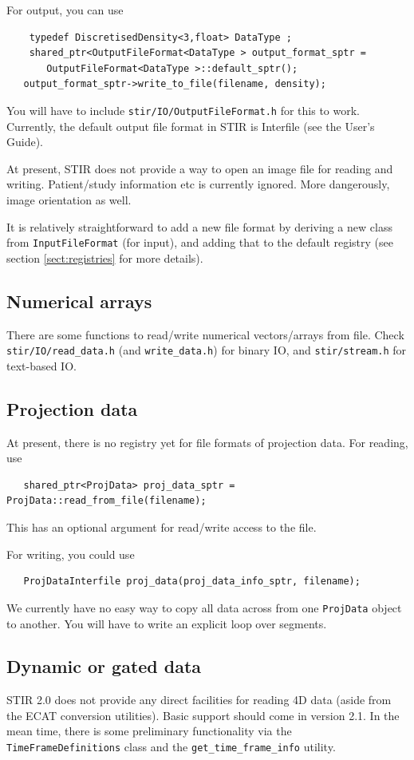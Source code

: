 \documentclass{article}
\begin{document}
For output, you can use
\begin{verbatim}
    typedef DiscretisedDensity<3,float> DataType ;
    shared_ptr<OutputFileFormat<DataType > output_format_sptr =
       OutputFileFormat<DataType >::default_sptr();
   output_format_sptr->write_to_file(filename, density);
\end{verbatim}
You will have to include \texttt{stir/IO/OutputFileFormat.h} for this to work.
Currently, the default output file format in STIR is Interfile (see the User's Guide).

At present, STIR does not provide a way to open an image file for reading and writing.
Patient/study information etc is currently ignored. More dangerously, image orientation
as well.

It is relatively straightforward to add a new file format by deriving a new class
from \texttt{InputFileFormat} (for input), and adding that to the default registry
(see section \ref{sect:registries} for more details).

\subsection{Numerical arrays}
There are some functions to read/write numerical vectors/arrays from
file. Check \texttt{stir/IO/read\_data.h} (and \texttt{write\_data.h}) for
binary IO, and \texttt{stir/stream.h} for text-based IO.

\subsection{Projection data}
At present, there is no registry yet for file formats of projection data. For reading, use
\begin{verbatim}
   shared_ptr<ProjData> proj_data_sptr = ProjData::read_from_file(filename);
\end{verbatim}
This has an optional argument for read/write access to the file.

For writing, you could use
\begin{verbatim}
   ProjDataInterfile proj_data(proj_data_info_sptr, filename);
\end{verbatim}
We currently have no easy way to copy all data across from one \texttt{ProjData}
object to another. You will have to write an explicit loop over segments.

\subsection{Dynamic or gated data}
STIR 2.0 does not provide any direct facilities for reading 4D data (aside from
the ECAT conversion utilities). Basic support should come in version 2.1.
In the mean time, there is some preliminary functionality via the 
\texttt{TimeFrameDefinitions} class and the \texttt{get\_time\_frame\_info}
utility.
\end{document}

